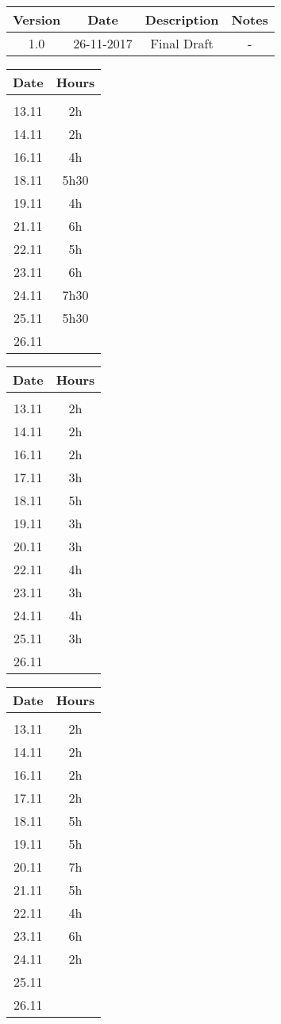 
\vspace{0.5cm}
\begin{tabular}[H]{c|c|c|c}
	Version & Date & Description & Notes\\
	\hline
	\rule{0pt}{4ex}1.0	&	26-11-2017	&	Final Draft	&	-
\end{tabular}

\vspace{0.5cm}
\begin{tabular}[H]{c|c}
	Date & Hours\\
	\hline\\
	13.11	&	2h\\
	14.11	&	2h\\
	16.11	&	4h\\
	18.11	&	5h30\\
	19.11	&	4h\\
	21.11	&	6h\\
	22.11	&	5h\\
	23.11	&	6h\\
	24.11	&	7h30\\
	25.11	&	5h30\\
	26.11	&	
\end{tabular}

\vspace{0.5cm}
\begin{tabular}[H]{c|c}
	Date & Hours\\
	\hline\\
	13.11	&	2h\\
	14.11	&	2h\\
	16.11	&	2h\\
	17.11	&	3h\\
	18.11	&	5h\\
	19.11	&	3h\\
	20.11	&	3h\\
	22.11	&	4h\\
	23.11	&	3h\\
	24.11	&	4h\\
	25.11	&	3h\\
	26.11	&	
\end{tabular}

\vspace{0.5cm}
\begin{tabular}[H]{c|c}
	Date & Hours\\
	\hline\\
	13.11	&	2h\\
	14.11	&	2h\\
	16.11	&	2h\\
	17.11	&	2h\\
	18.11	&	5h\\
	19.11	&	5h\\
	20.11	&	7h\\
	21.11	&	5h\\
	22.11	&	4h\\
	23.11	&	6h\\
	24.11	&	2h\\
	25.11	&	\\
	26.11	&	
\end{tabular}